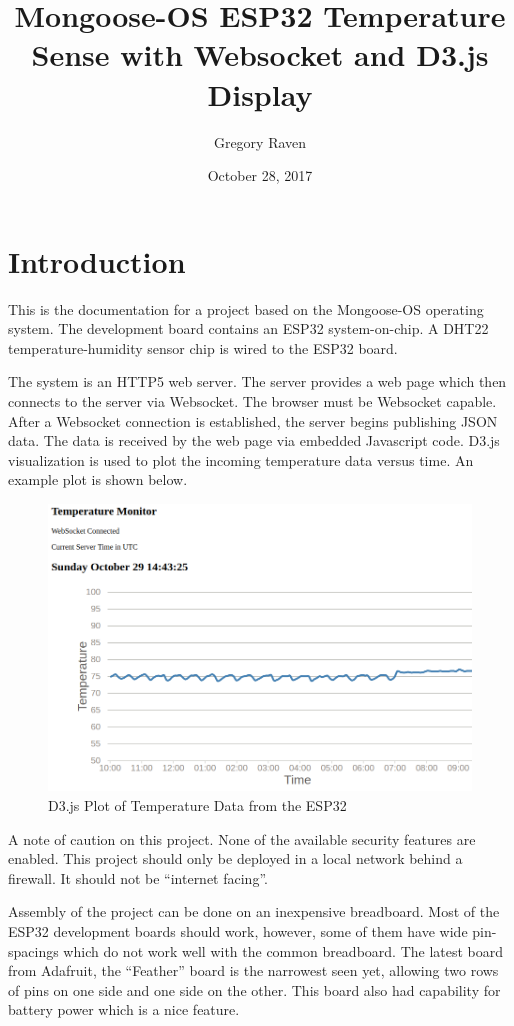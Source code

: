 \documentclass[letterpaper,]{book}
\title{Mongoose-OS ESP32 Temperature Sense with Websocket and D3.js Display}
\author{Gregory Raven}
\date{October 28, 2017}
\begin{document}
\maketitle

{
\setcounter{tocdepth}{2}
\tableofcontents
}
\chapter{Introduction}\label{introduction}

This is the documentation for a project based on the Mongoose-OS
operating system. The development board contains an ESP32
system-on-chip. A DHT22 temperature-humidity sensor chip is wired to the
ESP32 board.

The system is an HTTP5 web server. The server provides a web page which
then connects to the server via Websocket. The browser must be Websocket
capable. After a Websocket connection is established, the server begins
publishing JSON data. The data is received by the web page via embedded
Javascript code. D3.js visualization is used to plot the incoming
temperature data versus time. An example plot is shown below.

\begin{figure}
\centering
\includegraphics{tempviz1.png}
\caption{D3.js Plot of Temperature Data from the ESP32}
\end{figure}

A note of caution on this project. None of the available security
features are enabled. This project should only be deployed in a local
network behind a firewall. It should not be ``internet facing''.

Assembly of the project can be done on an inexpensive breadboard. Most
of the ESP32 development boards should work, however, some of them have
wide pin-spacings which do not work well with the common breadboard. The
latest board from Adafruit, the ``Feather'' board is the narrowest seen
yet, allowing two rows of pins on one side and one side on the other.
This board also had capability for battery power which is a nice
feature.
\end{document}
